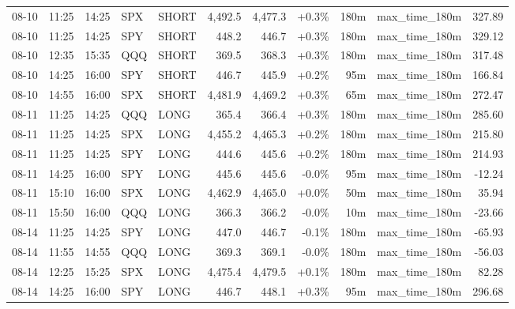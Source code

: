 \documentclass[11pt,a4paper,twoside]{article}
\begin{document}
\begin{center}
\begin{longtable}{>{\color{txtmain}}l l l l l r r r r >{\color{txtmain}}l r}
08-10 & 11:25 & 14:25 & SPX & SHORT & 4,492.5 & 4,477.3 & \textcolor{wingreen}{+0.3\%} & 180m & max\_time\_180m & \textcolor{wingreen}{327.89} \\
08-10 & 11:25 & 14:25 & SPY & SHORT & 448.2 & 446.7 & \textcolor{wingreen}{+0.3\%} & 180m & max\_time\_180m & \textcolor{wingreen}{329.12} \\
08-10 & 12:35 & 15:35 & QQQ & SHORT & 369.5 & 368.3 & \textcolor{wingreen}{+0.3\%} & 180m & max\_time\_180m & \textcolor{wingreen}{317.48} \\
08-10 & 14:25 & 16:00 & SPY & SHORT & 446.7 & 445.9 & \textcolor{wingreen}{+0.2\%} & 95m & max\_time\_180m & \textcolor{wingreen}{166.84} \\
08-10 & 14:55 & 16:00 & SPX & SHORT & 4,481.9 & 4,469.2 & \textcolor{wingreen}{+0.3\%} & 65m & max\_time\_180m & \textcolor{wingreen}{272.47} \\
08-11 & 11:25 & 14:25 & QQQ & LONG & 365.4 & 366.4 & \textcolor{wingreen}{+0.3\%} & 180m & max\_time\_180m & \textcolor{wingreen}{285.60} \\
08-11 & 11:25 & 14:25 & SPX & LONG & 4,455.2 & 4,465.3 & \textcolor{wingreen}{+0.2\%} & 180m & max\_time\_180m & \textcolor{wingreen}{215.80} \\
08-11 & 11:25 & 14:25 & SPY & LONG & 444.6 & 445.6 & \textcolor{wingreen}{+0.2\%} & 180m & max\_time\_180m & \textcolor{wingreen}{214.93} \\
08-11 & 14:25 & 16:00 & SPY & LONG & 445.6 & 445.6 & \textcolor{lossred}{-0.0\%} & 95m & max\_time\_180m & \textcolor{lossred}{-12.24} \\
08-11 & 15:10 & 16:00 & SPX & LONG & 4,462.9 & 4,465.0 & \textcolor{wingreen}{+0.0\%} & 50m & max\_time\_180m & \textcolor{wingreen}{35.94} \\
08-11 & 15:50 & 16:00 & QQQ & LONG & 366.3 & 366.2 & \textcolor{lossred}{-0.0\%} & 10m & max\_time\_180m & \textcolor{lossred}{-23.66} \\
08-14 & 11:25 & 14:25 & SPY & LONG & 447.0 & 446.7 & \textcolor{lossred}{-0.1\%} & 180m & max\_time\_180m & \textcolor{lossred}{-65.93} \\
08-14 & 11:55 & 14:55 & QQQ & LONG & 369.3 & 369.1 & \textcolor{lossred}{-0.0\%} & 180m & max\_time\_180m & \textcolor{lossred}{-56.03} \\
08-14 & 12:25 & 15:25 & SPX & LONG & 4,475.4 & 4,479.5 & \textcolor{wingreen}{+0.1\%} & 180m & max\_time\_180m & \textcolor{wingreen}{82.28} \\
08-14 & 14:25 & 16:00 & SPY & LONG & 446.7 & 448.1 & \textcolor{wingreen}{+0.3\%} & 95m & max\_time\_180m & \textcolor{wingreen}{296.68} \\

\end{longtable}
\end{center}
\end{document}
